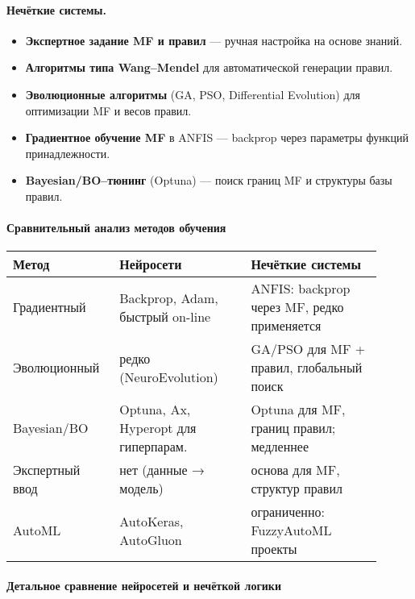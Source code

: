 \paragraph{Нечёткие системы.}
\begin{itemize}
  \item \textbf{Экспертное задание MF и правил} — ручная настройка на основе знаний.
  \item \textbf{Алгоритмы типа Wang–Mendel} \cite{Wang1992} для автоматической генерации правил.
  \item \textbf{Эволюционные алгоритмы} (GA, PSO, Differential Evolution) для оптимизации MF и весов правил.
  \item \textbf{Градиентное обучение MF} в ANFIS — backprop через параметры функций принадлежности.
  \item \textbf{Bayesian/BO–тюнинг} (Optuna) — поиск границ MF и структуры базы правил.
\end{itemize}

\paragraph{Сравнительный анализ методов обучения}
\begin{center}
\begin{tabular}{@{}p{0.25\linewidth}p{0.33\linewidth}p{0.33\linewidth}@{}}
\toprule
\textbf{Метод} & \textbf{Нейросети} & \textbf{Нечёткие системы} \\ \midrule
Градиентный & 
Backprop, Adam, быстрый on-line & 
ANFIS: backprop через MF, редко применяется  \\[2pt]
Эволюционный & 
редко (NeuroEvolution) &
GA/PSO для MF + правил, глобальный поиск \\[2pt]
Bayesian/BO & 
Optuna, Ax, Hyperopt для гиперпарам. &
Optuna для MF, границ правил; медленнее \\[2pt]
Экспертный ввод & 
нет (данные → модель) &
основа для MF, структур правил \\[2pt]
AutoML & 
AutoKeras, AutoGluon &
ограниченно: FuzzyAutoML проекты \\ 
\bottomrule
\end{tabular}
\end{center}

\paragraph{Детальное сравнение нейросетей и нечёткой логики}
\label{subsec:nn_vs_fuzzy_expanded2}

